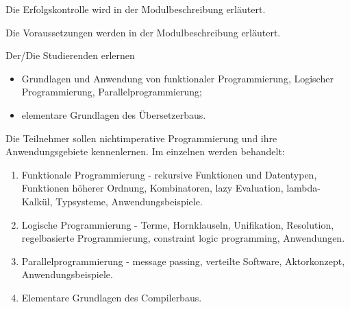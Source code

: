 \begin{course}

\setdoclanguagegerman
{}



\coursehead


\label{cour_7363.dp_997}


\begin{styleenv}
\begin{assessment}
Die Erfolgskontrolle wird in der Modulbeschreibung erläutert.


\end{assessment}

\begin{conditions}Die Voraussetzungen werden in der Modulbeschreibung erläutert.

\end{conditions}


\end{styleenv}

\begin{learningoutcomes}
Der/Die Studierenden erlernen

 \begin{itemize}\item Grundlagen und Anwendung von funktionaler Programmierung, Logischer Programmierung, Parallelprogrammierung;   \item elementare Grundlagen des Übersetzerbaus.  \end{itemize}
\end{learningoutcomes}

\begin{content}
Die Teilnehmer sollen nichtimperative Programmierung und ihre Anwendungsgebiete kennenlernen. Im einzelnen werden behandelt:

 \begin{enumerate}\item Funktionale Programmierung - rekursive Funktionen und Datentypen, Funktionen höherer Ordnung, Kombinatoren, lazy Evaluation, lambda-Kalkül, Typsysteme, Anwendungsbeispiele.  \item Logische Programmierung - Terme, Hornklauseln, Unifikation, Resolution, regelbasierte Programmierung, constraint logic programming, Anwendungen.  \item Parallelprogrammierung - message passing, verteilte Software, Aktorkonzept, Anwendungsbeispiele.  \item Elementare Grundlagen des Compilerbaus.  \end{enumerate}


\end{content}
\end{course}
